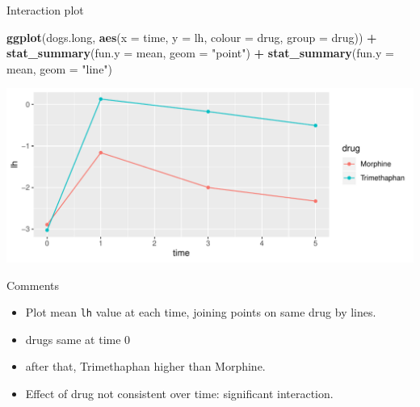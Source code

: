 \documentclass[ignorenonframetext,]{beamer}
\newenvironment{Shaded}{\begin{snugshade}}{\end{snugshade}}
\newcommand{\DataTypeTok}[1]{\textcolor[rgb]{0.13,0.29,0.53}{#1}}
\newcommand{\KeywordTok}[1]{\textcolor[rgb]{0.13,0.29,0.53}{\textbf{#1}}}
\newcommand{\NormalTok}[1]{#1}
\newcommand{\OperatorTok}[1]{\textcolor[rgb]{0.81,0.36,0.00}{\textbf{#1}}}
\newcommand{\StringTok}[1]{\textcolor[rgb]{0.31,0.60,0.02}{#1}}
\begin{document}
\begin{frame}[fragile]{Interaction plot}
\protect\hypertarget{interaction-plot-3}{}

\small

\begin{Shaded}
\begin{Highlighting}[]
\KeywordTok{ggplot}\NormalTok{(dogs.long, }\KeywordTok{aes}\NormalTok{(}\DataTypeTok{x =}\NormalTok{ time, }\DataTypeTok{y =}\NormalTok{ lh, }
                      \DataTypeTok{colour =}\NormalTok{ drug, }\DataTypeTok{group =}\NormalTok{ drug)) }\OperatorTok{+}
\StringTok{  }\KeywordTok{stat_summary}\NormalTok{(}\DataTypeTok{fun.y =}\NormalTok{ mean, }\DataTypeTok{geom =} \StringTok{"point"}\NormalTok{) }\OperatorTok{+}
\StringTok{  }\KeywordTok{stat_summary}\NormalTok{(}\DataTypeTok{fun.y =}\NormalTok{ mean, }\DataTypeTok{geom =} \StringTok{"line"}\NormalTok{)}
\end{Highlighting}
\end{Shaded}

\includegraphics{figure/unnamed-chunk-274-1.pdf} \normalsize

\end{frame}

\begin{frame}[fragile]{Comments}
\protect\hypertarget{comments-21}{}

\begin{itemize}
\item
  Plot mean \texttt{lh} value at each time, joining points on same drug
  by lines.
\item
  drugs same at time 0
\item
  after that, Trimethaphan higher than Morphine.
\item
  Effect of drug not consistent over time: significant interaction.
\end{itemize}

\end{frame}
\end{document}
